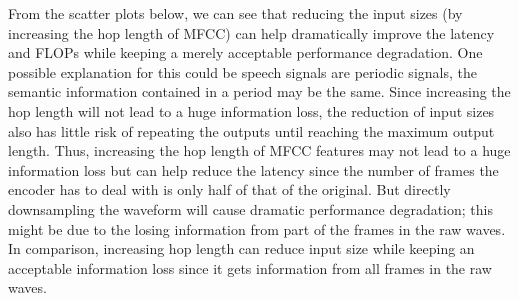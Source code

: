 \documentclass[11pt]{article}
\begin{document}
From the scatter plots below, we can see that reducing the input sizes (by increasing the hop length of MFCC) can help dramatically improve the latency and FLOPs while keeping a merely acceptable performance degradation. One possible explanation for this could be speech signals are periodic signals, the semantic information contained in a period may be the same. Since increasing the hop length will not lead to a huge information loss, the reduction of input sizes also has little risk of repeating the outputs until reaching the maximum output length. Thus, increasing the hop length of MFCC features may not lead to a huge information loss but can help reduce the latency since the number of frames the encoder has to deal with is only half of that of the original. But directly downsampling the waveform will cause dramatic performance degradation; this might be due to the losing information from part of the frames in the raw waves. In comparison, increasing hop length can reduce input size while keeping an acceptable information loss since it gets information from all frames in the raw waves. 
\end{document}
